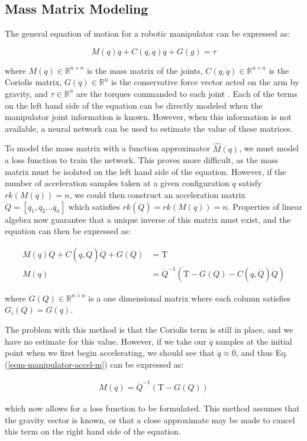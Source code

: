 \subsection*{Mass Matrix Modeling}

The general equation of motion for a robotic manipulator can be expressed as:

\begin{equation}
  \label{eom-manipulator}
  M(q)\ddot{q} + C(q,\dot{q})\dot{q} + G(g) = \tau
\end{equation}

\noindent where $M(q)\in\mathbb{R}^{n\times n}$ is the mass matrix of the joints,
$C(q,\dot{q})\in\mathbb{R}^{n\times n}$ is the Coriolis matrix,
$G(q)\in\mathbb{R}^{n}$ is the conservative force vector acted on the arm by
gravity, and $\tau\in\mathbb{R}^{n}$ are the torques commanded to each joint \cite{spong}.
Each of the terms on the left hand side of the equation can be directly modeled
when the manipulator joint information is known.
However, when this information is not available, a neural network can be used to
estimate the value of these matrices.

To model the mass matrix with a function approximator $\hat{M}(q)$, we must
model a loss function to train the network.
This proves more difficult, as the mass matrix must be isolated on the left hand
side of the equation.
However, if the number of acceleration samples taken at a given configuration
$q$ satisfy $rk(M(q)) = n$, we could then construct an acceleration
matrix $\ddot{Q} = [\ddot{q_{1}}, \ddot{q_{2}}\dots\ddot{q_{n}}]$ which
satisfies $rk(\ddot{Q}) = rk(M(q)) = n$.
Properties of linear algebra now guarantee that a unique inverse of this matrix
must exist, and the equation can then be expressed as:

\begin{align}
  \label{eom-manipulator-accel}
  M(q)\ddot{Q} + C(q,\dot{Q})\dot{Q} + G(Q) &= \mathrm{T}\\
  \label{eom-manipulator-accel-m}
  M(q) &= \ddot{Q}^{-1}(\mathrm{T} - G(Q) - C(q,\dot{Q})\dot{Q})
\end{align}

\noindent where $G(Q)\in\mathbb{R}^{n\times n}$ is a one dimensional matrix
where each column satisfies $G_{i}(Q) = G(q)$.

The problem with this method is that the Coriolis term is still in place, and we
have no estimate for this value.
However, if we take our $\ddot{q}$ samples at the initial point when we first
begin accelerating, we should see that $\dot{q} \approx 0$, and thus Eq.
(\ref{eom-manipulator-accel-m}) can be expressed as:

\begin{align}
  M(q) = \ddot{Q}^{-1}(\mathrm{T} - G(Q))
\end{align}

\noindent which now allows for a loss function to be formulated.
This method assumes that the gravity vector is known, or that a close approximate may be made to cancel this term on the right hand side of the equation.
